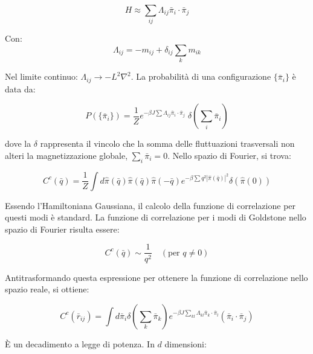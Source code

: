 \begin{equation} \label{eq:ch19_34}
H \approx \sum_{ij} \Lambda_{ij} \bar{\pi}_i \cdot \bar{\pi}_j
\end{equation}

Con:
\begin{equation} \label{eq:ch19_35}
\Lambda_{ij} = -m_{ij} + \delta_{ij} \sum_k m_{ik} 
\end{equation}

Nel limite continuo: $\Lambda_{ij} \rightarrow -L^2 \nabla^2$.
La probabilità di una configurazione $\{\bar{\pi}_i\}$ è data da:

\begin{equation} \label{eq:ch19_36}
P(\{\bar{\pi}_i\}) = \frac{1}{Z} e^{-\beta J \sum \Lambda_{ij} \bar{\pi}_i \cdot \bar{\pi}_j} \; \delta\left(\sum_i \bar{\pi}_i\right)
\end{equation}

dove la $\delta$ rappresenta il vincolo che la somma delle fluttuazioni trasversali non alteri la magnetizzazione globale, $\sum_i \bar{\pi}_i = 0$.
Nello spazio di Fourier, si trova:

\begin{equation} \label{eq:ch19_37}
C^c(\bar{q}) = \frac{1}{Z} \int d\hat{\pi}(\bar{q}) \hat{\pi}(\bar{q}) \hat{\pi}(-\bar{q}) e^{-\beta \sum q^2 |\hat{\pi}(\bar{q})|^2} \delta(\hat{\pi}(0))
\end{equation}

Essendo l'Hamiltoniana Gaussiana, il calcolo della funzione di correlazione per questi modi è standard. La funzione di correlazione per i modi di Goldstone nello spazio di Fourier risulta essere:

\begin{equation} \label{eq:ch19_38}
C^c(\bar{q}) \sim \frac{1}{q^2} \quad (\text{per } q \neq 0)
\end{equation}

Antitrasformando questa espressione per ottenere la funzione di correlazione nello spazio reale, si ottiene:

\begin{equation} \label{eq:ch19_39}
C^c(\bar{r}_{ij}) = \int d\bar{\pi}_i \delta\left(\sum_k \bar{\pi}_k\right) e^{-\beta J \sum_{kl} \Lambda_{kl} \bar{\pi}_k \cdot \bar{\pi}_l} (\bar{\pi}_i \cdot \bar{\pi}_j)
\end{equation}

È un decadimento a legge di potenza. In $d$ dimensioni:

\vspace{0.5cm}
\noindent{}
\vspace{0.5cm}

